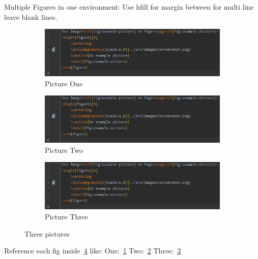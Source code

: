 Multiple Figures in one environment:
Use hfill for margin between for multi line leave blank lines.
\begin{figure}[hbt!]
    \centering
    \begin{subfigure}[hbt!]{0.49\textwidth}
        \centering
        \includegraphics[width=\textwidth]{../src/images/screenshot.png}
        \caption{Picture One}
        \label{fig:one}
    \end{subfigure}
    \hfill
    \begin{subfigure}[hbt!]{0.49\textwidth}
        \centering
        \includegraphics[width=\textwidth]{../src/images/screenshot.png}
        \caption{Picture Two}
        \label{fig:two}
    \end{subfigure}
    \newline
    \begin{subfigure}[hbt!]{\textwidth}
        \centering
        \includegraphics[width=\textwidth]{../src/images/screenshot.png}
        \caption{Picture Three}
        \label{fig:three}
    \end{subfigure}
    \caption{Three pictures}
    \label{fig:three-pictures}
\end{figure}

Reference each fig inside~\ref{fig:three-pictures} like:\newline
One:~\ref{fig:one}\newline
Two:~\ref{fig:two}\newline
Three:~\ref{fig:three}\newline
\clearpage
